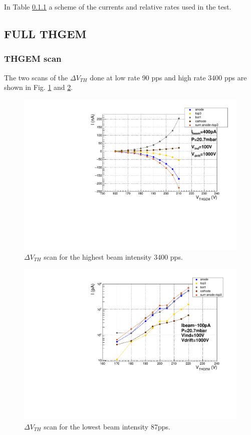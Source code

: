 \documentclass[a4paper, 11 pt]{report}
\newcommand{\Vthgem}{$\Delta V_{TH}$}
\begin{document}
In Table \ref{} a scheme of the currents and relative rates used in the test.

\clearpage
\subsection{FULL THGEM}

  \subsubsection{THGEM scan}
  The two scans of the \Vthgem{} done at low rate 90 pps and high rate 3400 pps are shown in Fig.
  \ref{fig:driftScan_withBeam_H} and \ref{fig:driftScan_withBeam_L}.
  \begin{figure}[htbp]
	\centering
	\includegraphics[width=\textwidth]
	{Immagini/thgemScan_THGEM10_20mbar-Vdrift1000V-2020-03-09.pdf}
	\caption{\Vthgem{} scan for the highest beam intensity 3400 pps. }
	\label{fig:driftScan_withBeam_H}
  \end{figure}
  \begin{figure}[htbp]
	\centering
	\includegraphics[width=\textwidth]
	{Immagini/thgemScan_THGEM10_20mbar_109pA-Vdrift1000V-2020-03-09_logscale.pdf}
	\caption{\Vthgem{} scan for the lowest beam intensity 87pps.}
	\label{fig:driftScan_withBeam_L}
  \end{figure}
\end{document}
